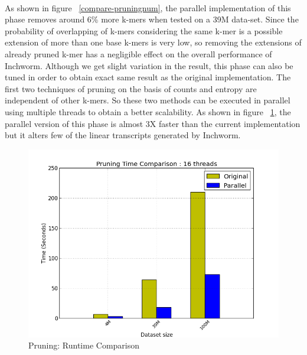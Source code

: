 \label{key}\documentclass[plainarticle, english ,zihtitle,final,hyperref,utf8]{zihpub}
\begin{document}
\paragraph{}
As shown in figure ~\ref{compare-pruningnum}, the parallel implementation of this phase removes around 6\% more k-mers when tested on a 39M data-set. Since the probability of overlapping of k-mers considering the same k-mer is a possible extension of more than one base k-mers is very low, so removing the extensions of already pruned k-mer has a negligible effect on the overall performance of Inchworm. Although we get slight variation in the result, this phase can also be tuned in order to obtain exact same result as the original implementation. The first two techniques of pruning on the basis of counts and entropy are independent of other k-mers. So these two methods can be executed in parallel using multiple threads to obtain a better scalability. As shown in figure ~\ref{compare-pruning}, the parallel version of this phase is almost 3X faster than the current implementation but it alters few of the linear transcripts generated by Inchworm.
\begin{figure}[h]
\center
\includegraphics[scale=0.5]{compare-pruning}
\caption{Pruning: Runtime Comparison}
\label{compare-pruning}
\end{figure}
\end{document}
